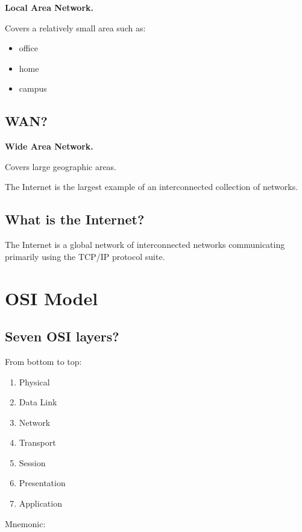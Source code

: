 \textbf{Local Area Network.}

Covers a relatively small area such as:

\begin{itemize}
  \item office
  \item home
  \item campus
\end{itemize}

\medskip

\subsection{WAN?}

\textbf{Wide Area Network.}

Covers large geographic areas.

The Internet is the largest example of an interconnected collection of networks.

\medskip

\subsection{What is the Internet?}

The Internet is a global network of interconnected networks communicating primarily using the TCP/IP protocol suite.

\medskip

\section{OSI Model}

\subsection{Seven OSI layers?}

From bottom to top:

\begin{enumerate}
  \item Physical
  \item Data Link
  \item Network
  \item Transport
  \item Session
  \item Presentation
  \item Application
\end{enumerate}

Mnemonic:

